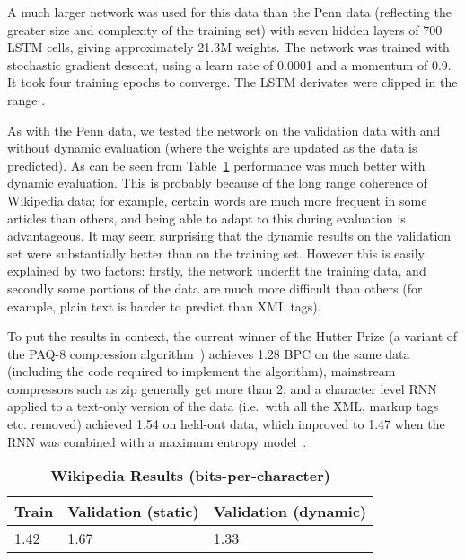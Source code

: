 \documentclass{article}
\newcommand{\ie}{i.e.\ }
\newcommand{\tlabel}[1]{\label{tab:#1}}
\newcommand{\tref}[1]{Table~\ref{tab:#1}}
\newcommand{\capt}[2]{\caption[#1]{\textbf{#1}#2}}
\begin{document}
A much larger network was used for this data than the Penn data (reflecting the greater size and complexity of the training set) with seven hidden layers of 700 LSTM cells, giving approximately 21.3M weights.
The network was trained with stochastic gradient descent, using a learn rate of 0.0001 and a momentum of 0.9.
It took four training epochs to converge.
The LSTM derivates were clipped in the range .

As with the Penn data, we tested the network on the validation data with and without dynamic evaluation (where the weights are updated as the data is predicted).
As can be seen from \tref{wiki} performance was much better with dynamic evaluation.
This is probably because of the long range coherence of Wikipedia data; for example, certain words are much more frequent in some articles than others, and being able to adapt to this during evaluation is advantageous.
It may seem surprising that the dynamic results on the validation set were substantially better than on the training set.
However this is easily explained by two factors: firstly, the network underfit the training data, and secondly some portions of the data are much more difficult than others (for example, plain text is harder to predict than XML tags).

To put the results in context, the current winner of the Hutter Prize (a variant of the PAQ-8 compression algorithm~\cite{knoll11paq}) achieves 1.28 BPC on the same data (including the code required to implement the algorithm), mainstream compressors such as zip generally get more than 2, and a character level RNN applied to a text-only version of the data (\ie with all the XML, markup tags etc. removed) achieved 1.54 on held-out data, which improved to 1.47 when the RNN was combined with a maximum entropy model~\cite{mikolov12subword}. 

\begin{table}
\centering
\capt{Wikipedia Results (bits-per-character)}{}
\tlabel{wiki}
\vskip 0.15in
\begin{center}
\begin{sc}
\begin{tabular}{lll}
\hline
Train & Validation (static) & Validation (dynamic)\\
\hline
1.42 & 1.67 & 1.33\\
\hline
\end{tabular}
\end{sc}
\end{center}
\end{table}
\end{document}
